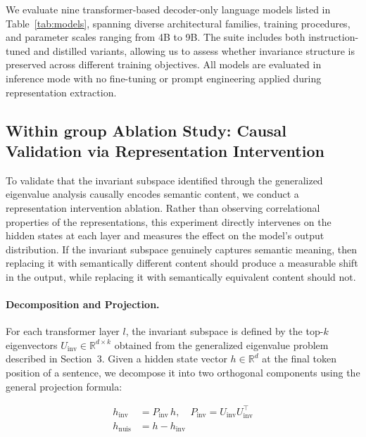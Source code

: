 We evaluate nine transformer-based decoder-only language models listed in Table~\ref{tab:models}, spanning diverse architectural families, training procedures, and parameter scales ranging from 4B to 9B. The suite includes both instruction-tuned and distilled variants, allowing us to assess whether invariance structure is preserved across different training objectives. All models are evaluated in inference mode with no fine-tuning or prompt engineering applied during representation extraction.




\subsection{Within group Ablation Study: Causal Validation via Representation Intervention}

To validate that the invariant subspace identified through the generalized eigenvalue analysis causally encodes semantic content, we conduct a representation intervention ablation. Rather than observing correlational properties of the representations, this experiment directly intervenes on the hidden states at each layer and measures the effect on the model's output distribution. If the invariant subspace genuinely captures semantic meaning, then replacing it with semantically different content should produce a measurable shift in the output, while replacing it with semantically equivalent content should not.

\paragraph{Decomposition and Projection.}
For each transformer layer $l$, the invariant subspace is defined by the top-$k$ eigenvectors $U_{\mathrm{inv}} \in \mathbb{R}^{d \times k}$ obtained from the generalized eigenvalue problem described in Section~3. Given a hidden state vector $h \in \mathbb{R}^d$ at the final token position of a sentence, we decompose it into two orthogonal components using the general projection formula:


\begin{align}
    h_{\mathrm{inv}}  &= P_{\mathrm{inv}} \, h, \quad P_{\mathrm{inv}} = U_{\mathrm{inv}} U_{\mathrm{inv}}^\top \\
    h_{\mathrm{nuis}} &= h - h_{\mathrm{inv}}
\end{align}

